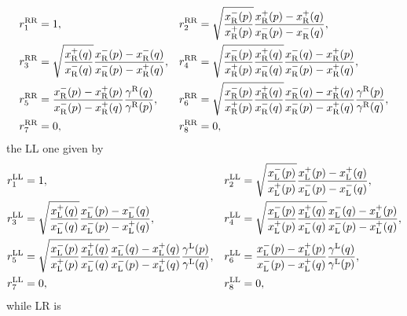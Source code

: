 \documentclass[12pt,a4paper]{article}
\numberwithin{equation}{section}
\begin{document}
\begin{align}
& r_1^{{\rm RR}}=1,&& r_2^{{\rm RR}}=\sqrt{\frac{x^-_{{\rm R}}(p)}{x^+_{{\rm R}}(p)}}\frac{x^+_{{\rm R}}(p)-x^+_{{\rm R}}(q)}{x^-_{{\rm R}}(p)-x^-_{{\rm R}}(q)},\nonumber\\
& r_3^{{\rm RR}}=\sqrt{\frac{x^+_{{\rm R}}(q)}{x^-_{{\rm R}}(q)}}\frac{x^-_{{\rm R}}(p)-x^-_{{\rm R}}(q)}{x^-_{{\rm R}}(p)-x^+_{{\rm R}}(q)},&& r_4^{{\rm RR}}=\sqrt{\frac{x^-_{{\rm R}}(p)}{x^+_{{\rm R}}(p)}\frac{x^+_{{\rm R}}(q)}{x^-_{{\rm R}}(q)}}\frac{x^-_{{\rm R}}(q)-x^+_{{\rm R}}(p)}{x^-_{{\rm R}}(p)-x^+_{{\rm R}}(q)},\nonumber\\
& r_5^{{\rm RR}}=\frac{x^-_{{\rm R}}(p)-x^+_{{\rm R}}(p)}{x^-_{{\rm R}}(p)-x^+_{{\rm R}}(q)}\frac{\gamma^{{\rm R}}(q)}{\gamma^{{\rm R}}(p)}, && r_6^{{\rm RR}}= \sqrt{\frac{x^-_{{\rm R}}(p)}{x^+_{{\rm R}}(p)}\frac{x^+_{{\rm R}}(q)}{x^-_{{\rm R}}(q)}}\frac{x^-_{{\rm R}}(q)-x^+_{{\rm R}}(q)}{x^-_{{\rm R}}(p)-x^+_{{\rm R}}(q)}\frac{\gamma^{{\rm R}}(p)}{\gamma^{{\rm R}}(q)},\nonumber\\
& r_7^{{\rm RR}}=0, && r_8^{{\rm RR}}=0,
\end{align}
the LL one given by
\begin{align}
& r_1^{{\rm LL}}=1,&& r_2^{{\rm LL}}=\sqrt{\frac{x^-_{{\rm L}}(p)}{x^+_{{\rm L}}(p)}}\frac{x^+_{{\rm L}}(p)-x^+_{{\rm L}}(q)}{x^-_{{\rm L}}(p)-x^-_{{\rm L}}(q)},\nonumber\\
& r_3^{{\rm LL}}=\sqrt{\frac{x^+_{{\rm L}}(q)}{x^-_{{\rm L}}(q)}}\frac{x^-_{{\rm L}}(p)-x^-_{{\rm L}}(q)}{x^-_{{\rm L}}(p)-x^+_{{\rm L}}(q)},&& r_4^{{\rm LL}}=\sqrt{\frac{x^-_{{\rm L}}(p)}{x^+_{{\rm L}}(p)}\frac{x^+_{{\rm L}}(q)}{x^-_{{\rm L}}(q)}}\frac{x^-_{{\rm L}}(q)-x^+_{{\rm L}}(p)}{x^-_{{\rm L}}(p)-x^+_{{\rm L}}(q)},\nonumber\\
& r_5^{{\rm LL}}=\sqrt{\frac{x^-_{{\rm L}}(p)}{x^+_{{\rm L}}(p)}\frac{x^+_{{\rm L}}(q)}{x^-_{{\rm L}}(q)}}\frac{x^-_{{\rm L}}(q)-x^+_{{\rm L}}(q)}{x^-_{{\rm L}}(p)-x^+_{{\rm L}}(q)}\frac{\gamma^{{\rm L}}(p)}{\gamma^{{\rm L}}(q)}, && r_6^{{\rm LL}}= \frac{x^-_{{\rm L}}(p)-x^+_{{\rm L}}(p)}{x^-_{{\rm L}}(p)-x^+_{{\rm L}}(q)}\frac{\gamma^{{\rm L}}(q)}{\gamma^{{\rm L}}(p)},\nonumber\\
& r_7^{{\rm LL}}=0, && r_8^{{\rm LL}}=0,
\end{align}
while LR is
\end{document}
